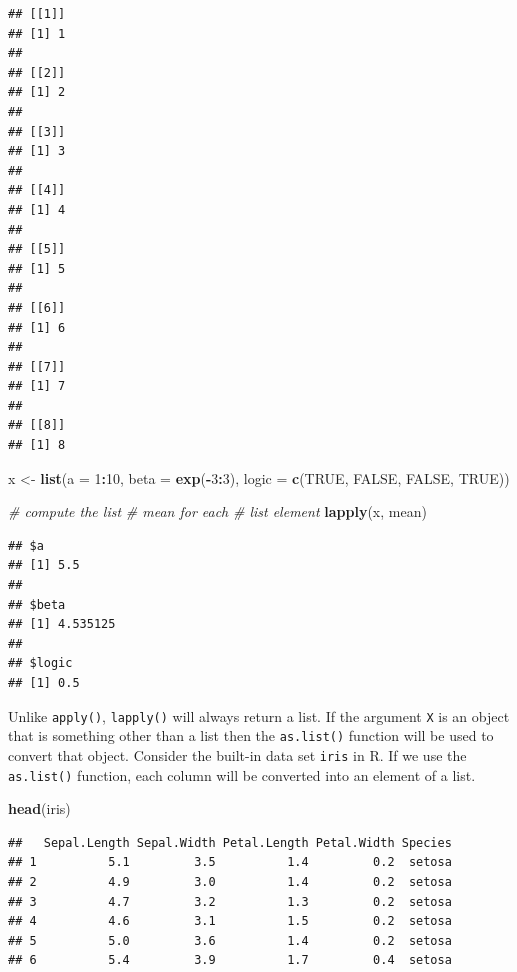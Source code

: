 \documentclass[
]{book}
\newenvironment{Shaded}{\begin{snugshade}}{\end{snugshade}}
\newcommand{\CommentTok}[1]{\textcolor[rgb]{0.56,0.35,0.01}{\textit{#1}}}
\newcommand{\DataTypeTok}[1]{\textcolor[rgb]{0.13,0.29,0.53}{#1}}
\newcommand{\DecValTok}[1]{\textcolor[rgb]{0.00,0.00,0.81}{#1}}
\newcommand{\KeywordTok}[1]{\textcolor[rgb]{0.13,0.29,0.53}{\textbf{#1}}}
\newcommand{\NormalTok}[1]{#1}
\newcommand{\OperatorTok}[1]{\textcolor[rgb]{0.81,0.36,0.00}{\textbf{#1}}}
\newcommand{\OtherTok}[1]{\textcolor[rgb]{0.56,0.35,0.01}{#1}}
\newcommand{\StringTok}[1]{\textcolor[rgb]{0.31,0.60,0.02}{#1}}
\begin{document}
\begin{verbatim}
## [[1]]
## [1] 1
## 
## [[2]]
## [1] 2
## 
## [[3]]
## [1] 3
## 
## [[4]]
## [1] 4
## 
## [[5]]
## [1] 5
## 
## [[6]]
## [1] 6
## 
## [[7]]
## [1] 7
## 
## [[8]]
## [1] 8
\end{verbatim}

\begin{Shaded}
\begin{Highlighting}[]
\NormalTok{x <-}\StringTok{ }\KeywordTok{list}\NormalTok{(}\DataTypeTok{a =} \DecValTok{1}\OperatorTok{:}\DecValTok{10}\NormalTok{, }\DataTypeTok{beta =} \KeywordTok{exp}\NormalTok{(}\OperatorTok{-}\DecValTok{3}\OperatorTok{:}\DecValTok{3}\NormalTok{),}
    \DataTypeTok{logic =} \KeywordTok{c}\NormalTok{(}\OtherTok{TRUE}\NormalTok{, }\OtherTok{FALSE}\NormalTok{,}
        \OtherTok{FALSE}\NormalTok{, }\OtherTok{TRUE}\NormalTok{))}

\CommentTok{# compute the list}
\CommentTok{# mean for each}
\CommentTok{# list element}
\KeywordTok{lapply}\NormalTok{(x, mean)}
\end{Highlighting}
\end{Shaded}

\begin{verbatim}
## $a
## [1] 5.5
## 
## $beta
## [1] 4.535125
## 
## $logic
## [1] 0.5
\end{verbatim}

Unlike \texttt{apply()}, \texttt{lapply()} will always return a list. If the argument \texttt{X} is an object that is something other than a list then the \texttt{as.list()} function will be used to convert that object. Consider the built-in data set \texttt{iris} in R. If we use the \texttt{as.list()} function, each column will be converted into an element of a list.

\begin{Shaded}
\begin{Highlighting}[]
\KeywordTok{head}\NormalTok{(iris)}
\end{Highlighting}
\end{Shaded}

\begin{verbatim}
##   Sepal.Length Sepal.Width Petal.Length Petal.Width Species
## 1          5.1         3.5          1.4         0.2  setosa
## 2          4.9         3.0          1.4         0.2  setosa
## 3          4.7         3.2          1.3         0.2  setosa
## 4          4.6         3.1          1.5         0.2  setosa
## 5          5.0         3.6          1.4         0.2  setosa
## 6          5.4         3.9          1.7         0.4  setosa
\end{verbatim}
\end{document}
